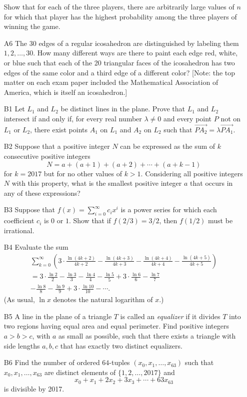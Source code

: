 \documentclass[amssymb,twocolumn,pra,10pt,aps]{revtex4-1}
\begin{document}
\begin{itemize}
Show that for each of the three players, there are arbitrarily large values of $n$ for which that player has the highest probability among the three players of winning the game. 

\item[A6]
The 30 edges of a regular icosahedron are distinguished by labeling them $1,2,\dots,30$. How many different ways 
are there to paint each edge red, white, or blue such that each of the 20 triangular faces of the icosahedron has two edges of the same color and a third edge of a different color? [Note: the top matter on each exam paper included the Mathematical Association of America, which is itself an icosahedron.]

\item[B1]
Let $L_1$ and $L_2$ be distinct lines in the plane. Prove that $L_1$ and $L_2$ intersect if and only if, for every
real number $\lambda\neq 0$ and every point $P$ not on $L_1$ or $L_2$, there exist points $A_1$ on $L_1$ and $A_2$
on $L_2$ such that $\overrightarrow{PA_2} = \lambda \overrightarrow{PA_1}$.

\item[B2]
Suppose that a positive integer $N$ can be expressed as the sum of $k$ consecutive positive integers
\[
N = a + (a+1) +(a+2) + \cdots + (a+k-1)
\]
for $k=2017$ but for no other values of $k>1$. Considering all positive integers $N$ with this property,
what is the smallest positive integer $a$ that occurs in any of these expressions?

\item[B3]
Suppose that $f(x) = \sum_{i=0}^\infty c_i x^i$ is a power series for which each coefficient $c_i$ is $0$ or $1$.
Show that if $f(2/3) = 3/2$, then $f(1/2)$ must be irrational.

\item[B4]
Evaluate the sum
\begin{gather*}
\sum_{k=0}^\infty \left( 3 \cdot \frac{\ln(4k+2)}{4k+2} - \frac{\ln(4k+3)}{4k+3} - \frac{\ln(4k+4)}{4k+4} - \frac{\ln(4k+5)}{4k+5} \right) \\
= 3 \cdot \frac{\ln 2}{2} - \frac{\ln 3}{3} - \frac{\ln 4}{4} - \frac{\ln 5}{5}
+ 3 \cdot \frac{\ln 6}{6} - \frac{\ln 7}{7} \\ - \frac{\ln 8}{8} - \frac{\ln 9}{9}
+ 3 \cdot \frac{\ln 10}{10} - \cdots .
\end{gather*}
(As usual, $\ln x$ denotes the natural logarithm of $x$.)

\item[B5]
A line in the plane of a triangle $T$ is called an \emph{equalizer} if it divides $T$ into two regions having equal area and equal perimeter. Find positive integers $a>b>c$, with $a$ as small as possible, such that there exists a triangle with side lengths $a, b, c$ that has exactly two distinct equalizers.

\item[B6]
Find the number of ordered $64$-tuples $(x_0,x_1,\dots,x_{63})$ such that $x_0,x_1,\dots,x_{63}$ are distinct elements of $\{1,2,\dots,2017\}$ and 
\[
x_0 + x_1 + 2x_2 + 3x_3 + \cdots + 63 x_{63}
\]
is divisible by 2017.
\end{itemize}
\end{document}
